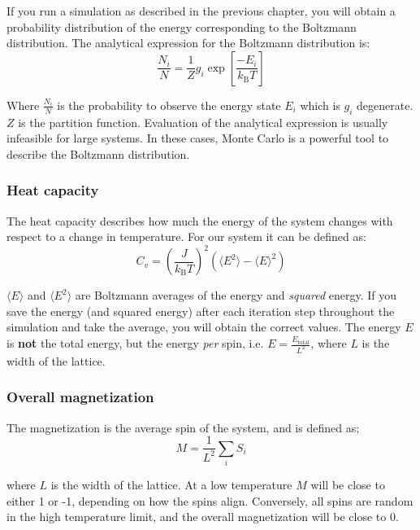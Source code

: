 \documentclass{article}
\begin{document}
If you run a simulation as described in the previous chapter, you will obtain a probability distribution of the energy corresponding to the Boltzmann distribution.
The analytical expression for the Boltzmann distribution is:
\begin{equation}
\frac{N_i}{N} = \frac{1}{Z} g_i \exp \left[ \frac{-E_i}{k_{\mathrm{B}}T} \right]
\end{equation}

Where $\frac{N_i}{N}$ is the probability to observe the energy state $E_i$ which is $g_i$ degenerate.
$Z$ is the partition function.
Evaluation of the analytical expression is usually infeasible for large systems.
In these cases, Monte Carlo is a powerful tool to describe the Boltzmann distribution.

\subsubsection{Heat capacity}

The heat capacity describes how much the energy of the system changes with respect to a change in temperature.
For our system it can be defined as:
\begin{equation}
C_v = \left( \frac{J}{k_{\mathrm{B}}T} \right)^2 \left( \langle E^2 \rangle - \langle E \rangle^2 \right)
\end{equation}

$\langle E \rangle$ and $\langle E^2 \rangle$ are Boltzmann averages of the energy and \textit{squared} energy.
If you save the energy (and squared energy) after each iteration step throughout the simulation and take the average, you will obtain the correct values.
The energy $E$ is \textbf{not} the total energy, but the energy \textit{per} spin, i.e. $E = \frac{E_\mathrm{total}}{L^2}$,
where $L$ is the width of the lattice.

\subsubsection{Overall magnetization}

The magnetization is the average spin of the system, and is defined as;
\begin{equation}
M =\frac{1}{L^2} \sum_i S_i
\end{equation}

where $L$ is the width of the lattice.
At a low temperature $M$ will be close to either 1 or -1, depending on how the spins align.
Conversely, all spins are random in the high temperature limit, and the overall magnetization will be close to 0.
\end{document}
